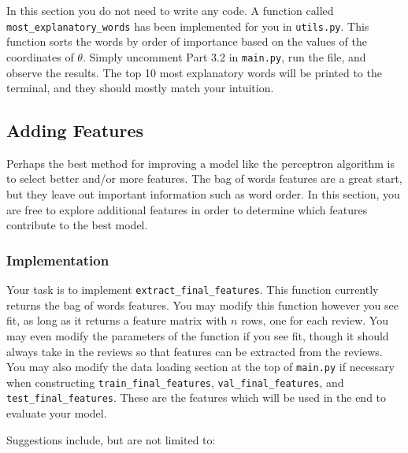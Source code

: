 \documentclass{article}
\begin{document}
In this section you do not need to write any code. A function called \\ \texttt{most\_explanatory\_words} has been implemented for you in \texttt{utils.py}. This function sorts the words by order of importance based on the values of the coordinates of $\theta$. Simply uncomment Part 3.2 in \texttt{main.py}, run the file, and observe the results. The top 10 most explanatory words will be printed to the terminal, and they should mostly match your intuition.

\subsection{Adding Features}

Perhaps the best method for improving a model like the perceptron algorithm is to select better and/or more features. The bag of words features are a great start, but they leave out important information such as word order. In this section, you are free to explore additional features in order to determine which features contribute to the best model.

\subsubsection{Implementation}

Your task is to implement \texttt{extract\_final\_features}. This function currently returns the bag of words features. You may modify this function however you see fit, as long as it returns a feature matrix with $n$ rows, one for each review. You may even modify the parameters of the function if you see fit, though it should always take in the reviews so that features can be extracted from the reviews. You may also modify the data loading section at the top of \texttt{main.py} if necessary when constructing \texttt{train\_final\_features}, \texttt{val\_final\_features}, and \texttt{test\_final\_features}. These are the features which will be used in the end to evaluate your model.

Suggestions include, but are not limited to:
\end{document}
